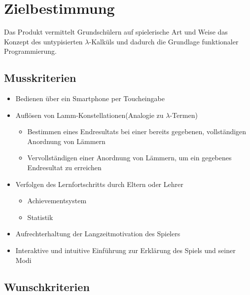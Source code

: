 \section{Zielbestimmung}

	Das Produkt vermittelt Grundschülern auf spielerische Art und Weise das Konzept des   			    untypisierten $\lambda$-Kalküls und dadurch die Grundlage funktionaler Programmierung.

\subsection{Musskriterien}

\begin{itemize}
	\item Bedienen über ein Smartphone per Toucheingabe
	\item Auflösen von Lamm-Konstellationen(Analogie zu $\lambda$-Termen)
	\begin{itemize}
		\item Bestimmen eines Endresultats bei einer bereits gegebenen, vollständigen Anordnung 				  von Lämmern
		\item Vervollständigen einer Anordnung von Lämmern, um ein gegebenes Endresultat zu  					  erreichen
	\end{itemize}
	\item Verfolgen des Lernfortschritts durch Eltern oder Lehrer
	\begin{itemize}
		\item Achievementsystem
		\item Statistik
	\end{itemize}
	\item Aufrechterhaltung der Langzeitmotivation des Spielers
	\item Interaktive und intuitive Einführung zur Erklärung des Spiels und seiner Modi
\end{itemize}

\subsection{Wunschkriterien}

